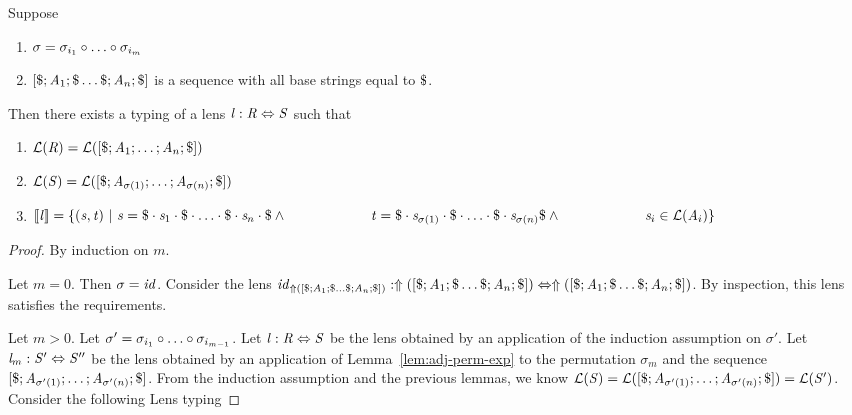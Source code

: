 \documentclass[numbers]{sigplanconf}
\begin{document}
\begin{lemma}
  \label{lem:adj-comp-perm-exp}
  Suppose
  \begin{enumerate}
  \item $\sigma=\sigma_{i_1}\circ\ldots\circ\sigma_{i_m}$ 
  \item $[\$;\mathit{A}_1;\$\ldots\$;\mathit{A}_n;\$]$ is a sequence with
    all base strings equal to $\Sep$.
  \end{enumerate}
  Then there exists a typing of a lens $\mathit{l} : \mathit{R} \Leftrightarrow \mathit{S}$ such that
  \begin{enumerate}
  \item $\mathcal{L}(\mathit{R})=\mathcal{L}([\$;\mathit{A}_1;\ldots;\mathit{A}_n;\$])$
  \item $\mathcal{L}(\mathit{S})=\mathcal{L}([\$;\mathit{A}_{\sigma(1)};\ldots;\mathit{A}_{\sigma(n)};\$])$
  \item $[ \! [\mathit{l}] \! ]=
    \{(\mathit{s},\mathit{t})~|~\mathit{s}=\$\cdot\mathit{s}_1\cdot\$\cdot\ldots\cdot\$\cdot\mathit{s}_n\cdot\$
      \wedge\\
      \hspace*{6em}\mathit{t}=\$\cdot\mathit{s}_{\sigma(1)}\cdot\$\cdot\ldots\cdot\$\cdot\mathit{s}_{\sigma(n)}\$\wedge\\
      \hspace*{6em}\mathit{s}_i\in\mathcal{L}(\mathit{A}_i)\}$
  \end{enumerate}
  \begin{proof}
    By induction on $m$.

    Let $m=0$.  Then $\sigma=\mathit{id}$.  Consider the lens
    $\mathit{id}_{\Uparrow([\$;\mathit{A}_1;\$\ldots\$;\mathit{A}_n;\$])} :
    \Uparrow([\$;\mathit{A}_1;\$\ldots\$;\mathit{A}_n;\$]) \Leftrightarrow
    \Uparrow([\$;\mathit{A}_1;\$\ldots\$;\mathit{A}_n;\$])$.
    By inspection, this lens satisfies the requirements.

    Let $m>0$.  Let $\sigma'=\sigma_{i_1}\circ\ldots\circ\sigma_{i_{m-1}}$.
    Let $\mathit{l} : \mathit{R} \Leftrightarrow \mathit{S}$ be the lens obtained by an
    application of the induction assumption on $\sigma'$.
    Let $\mathit{l}_m : \mathit{S}' \Leftrightarrow \mathit{S}''$ be the lens obtained by
    an application of Lemma~\ref{lem:adj-perm-exp} to the permutation $\sigma_m$ and
    the sequence $[\$;\mathit{A}_{\sigma'(1)};\ldots;\mathit{A}_{\sigma'(n)};\$]$.
    From the induction assumption and the previous lemmas,
    we know $\mathcal{L}(\mathit{S})=
    \mathcal{L}([\$;\mathit{A}_{\sigma'(1)};\ldots;\mathit{A}_{\sigma'(n)};\$])=
    \mathcal{L}(\mathit{S}')$.
    Consider the following Lens typing


\end{proof}
\end{lemma}
\end{document}

